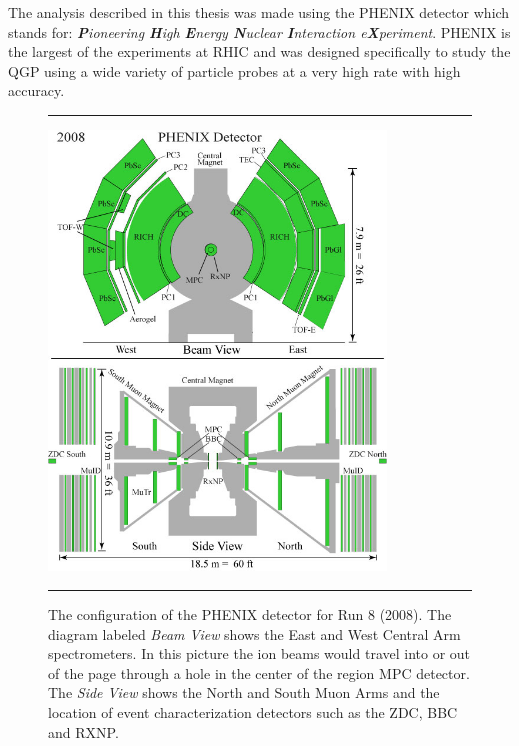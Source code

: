 \indent The analysis described in this thesis was made using the PHENIX detector which stands for: \textit{\textbf{P}ioneering \textbf{H}igh \textbf{E}nergy \textbf{N}uclear \textbf{I}nteraction e\textbf{X}periment}. PHENIX is the largest of the experiments at RHIC and was designed specifically to study the QGP using a wide variety of particle probes at a very high rate with high accuracy.  
\begin{figure}[htbp]
  \centering    \rule{35em}{0.5pt}
    \includegraphics[width=0.8\textwidth]{Figures/Phenix_2008.jpg}

  \caption[PHENIX Detector Configuration for RHIC Run 8 (2008)]{The configuration of the PHENIX detector for Run 8 (2008). The diagram labeled \textit{Beam View} shows the East and West Central Arm spectrometers. In this picture the ion beams would travel into or out of the page through a hole in the center of the region MPC detector. The \textit{Side View} shows the North and South Muon Arms and the location of event characterization detectors such as the ZDC, BBC and RXNP.}
    \rule{35em}{0.5pt}
  \label{fig:run8config}
\end{figure}
